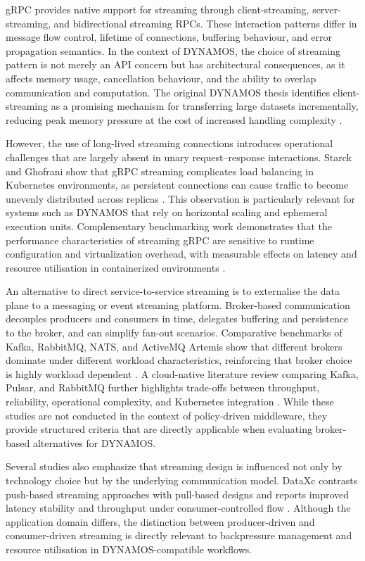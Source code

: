 \documentclass[a4paper,10pt,british]{scrartcl}
\begin{document}
gRPC provides native support for streaming through client-streaming, server-streaming, and bidirectional streaming RPCs. These interaction patterns differ in message flow control, lifetime of connections, buffering behaviour, and error propagation semantics. In the context of DYNAMOS, the choice of streaming pattern is not merely an API concern but has architectural consequences, as it affects memory usage, cancellation behaviour, and the ability to overlap communication and computation. The original DYNAMOS thesis identifies client-streaming as a promising mechanism for transferring large datasets incrementally, reducing peak memory pressure at the cost of increased handling complexity \cite{stutterheim2023thesis}.

However, the use of long-lived streaming connections introduces operational challenges that are largely absent in unary request--response interactions. Starck and Ghofrani show that gRPC streaming complicates load balancing in Kubernetes environments, as persistent connections can cause traffic to become unevenly distributed across replicas \cite{starck2023streaminglb}. This observation is particularly relevant for systems such as DYNAMOS that rely on horizontal scaling and ephemeral execution units. Complementary benchmarking work demonstrates that the performance characteristics of streaming gRPC are sensitive to runtime configuration and virtualization overhead, with measurable effects on latency and resource utilisation in containerized environments \cite{sodankoor2026grpcbench}.

An alternative to direct service-to-service streaming is to externalise the data plane to a messaging or event streaming platform. Broker-based communication decouples producers and consumers in time, delegates buffering and persistence to the broker, and can simplify fan-out scenarios. Comparative benchmarks of Kafka, RabbitMQ, NATS, and ActiveMQ Artemis show that different brokers dominate under different workload characteristics, reinforcing that broker choice is highly workload dependent \cite{ibrahim2026brokers}. A cloud-native literature review comparing Kafka, Pulsar, and RabbitMQ further highlights trade-offs between throughput, reliability, operational complexity, and Kubernetes integration \cite{nuikka2021cloudnative}. While these studies are not conducted in the context of policy-driven middleware, they provide structured criteria that are directly applicable when evaluating broker-based alternatives for DYNAMOS.

Several studies also emphasize that streaming design is influenced not only by technology choice but by the underlying communication model. DataXc contrasts push-based streaming approaches with pull-based designs and reports improved latency stability and throughput under consumer-controlled flow \cite{coviello2022dataxc}. Although the application domain differs, the distinction between producer-driven and consumer-driven streaming is directly relevant to backpressure management and resource utilisation in DYNAMOS-compatible workflows.
\end{document}
